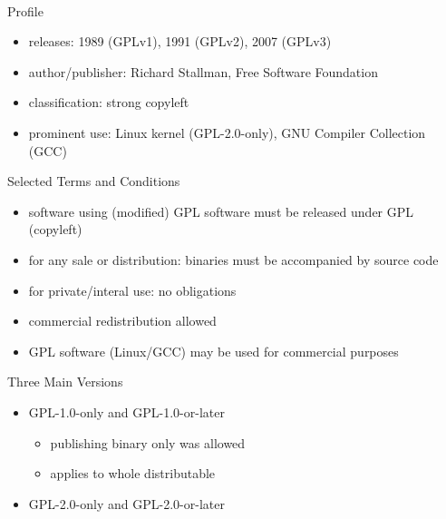 \begin{frame}{\insertsubsection\ } %
	\begin{fancycolumns}
		\begin{definition}{Profile}
			\begin{itemize}
				\setlength\itemsep{.0em}
				\item releases: 1989 (GPLv1), 1991 (GPLv2), 2007 (GPLv3)
				\item author/publisher: Richard Stallman, Free Software Foundation
				\item classification: strong copyleft
				\item prominent use: Linux kernel (GPL-2.0-only), GNU Compiler Collection (GCC)
			\end{itemize}
		\end{definition}
		\begin{example}{Selected Terms and Conditions}
			\begin{itemize}
				\setlength\itemsep{.0em}
				\item software using (modified) GPL software must be released under GPL (copyleft) %
				\item for any sale or distribution: binaries must be accompanied by source code
				\item for private/interal use: no obligations
				\item commercial redistribution allowed
				\item GPL software (Linux/GCC) may be used for commercial purposes
			\end{itemize}
		\end{example}
		\nextcolumn
		\begin{exampletight}{}
			\centering{}
		\end{exampletight}
		\begin{note}{Three Main Versions}
			\begin{itemize}
				\item GPL-1.0-only and GPL-1.0-or-later
				      \begin{itemize}
					      \item publishing binary only was allowed
					      \item applies to whole distributable
				      \end{itemize}
				\item GPL-2.0-only and GPL-2.0-or-later
				      \begin{itemize}

\end{itemize}
\end{itemize}
\end{note}
\end{fancycolumns}
\end{frame}
